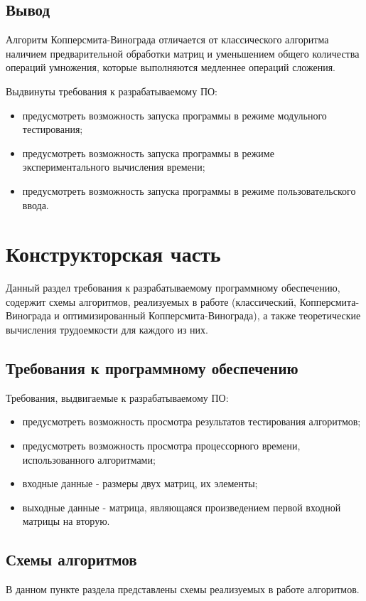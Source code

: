 \documentclass[12pt]{report}
\begin{document}
    \section{Вывод}
    Алгоритм Копперсмита-Винограда отличается от классического алгоритма наличием
    предварительной обработки матриц и уменьшением общего количества операций умножения,
    которые выполняются медленнее операций сложения.
    
    Выдвинуты требования к разрабатываемому ПО:
    \begin{itemize}
    	\item предусмотреть возможность запуска программы в режиме модульного тестирования;
    	\item предусмотреть возможность запуска программы в режиме экспериментального вычисления времени;
    	\item предусмотреть возможность запуска программы в режиме пользовательского ввода.
    \end{itemize}
    \newpage


    \chapter{Конструкторская часть}
    Данный раздел требования к разрабатываемому программному обеспечению,
    содержит схемы алгоритмов, реализуемых в работе
    (классический, Копперсмита-Винограда и оптимизированный Копперсмита-Винограда),
    а также теоретические вычисления трудоемкости для каждого из них.


    \section{Требования к программному обеспечению}
    Требования, выдвигаемые к разрабатываемому ПО:
    \begin{itemize}
        \item предусмотреть возможность просмотра результатов тестирования алгоритмов;
        \item предусмотреть возможность просмотра процессорного времени, использованного алгоритмами;
        \item входные данные - размеры двух матриц, их элементы;
        \item выходные данные - матрица, являющаяся произведением первой входной матрицы на вторую.
    \end{itemize}


    \section{Схемы алгоритмов}
    В данном пункте раздела представлены схемы реализуемых в работе алгоритмов.
\end{document}
